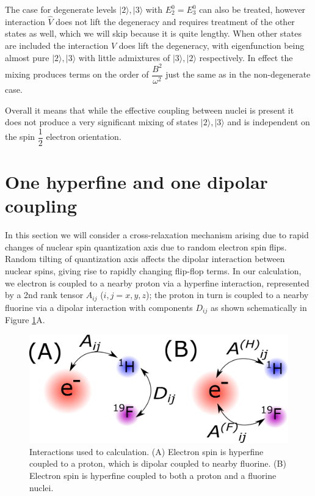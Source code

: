 \documentclass[a4paper, 12pt]{article}
\begin{document}
The case for degenerate levels $\vert 2 \rangle, \vert 3 \rangle$ with $E_2^0 = E_3^0$ can also be treated, however interaction $\hat{V}$ does not lift the degeneracy and requires treatment of the other states as well, which we will skip  because it is quite lengthy. When other states are included the interaction $\hat{V}$ does lift the degeneracy, with eigenfunction being almost pure $\vert 2 \rangle, \vert 3 \rangle$ with little admixtures of $\vert 3 \rangle, \vert 2 \rangle$ respectively. In effect the mixing produces terms on the order of $\dfrac{B^2}{\omega^2}$ just the same as in the non-degenerate case. 

Overall it means that while the effective coupling between nuclei is present it  does not produce a very significant mixing of states $\vert 2 \rangle, \vert 3 \rangle$ and is independent on the spin $\dfrac{1}{2}$ electron orientation.




\section{One hyperfine and one dipolar coupling} \label{sec: case A}
In this section we will consider a cross-relaxation mechanism arising due to rapid changes of nuclear spin quantization axis due to random electron spin flips. Random tilting of quantization axis affects the dipolar interaction between nuclear spins, giving rise to rapidly changing flip-flop terms.
In our calculation, we electron is coupled to a nearby proton via a hyperfine interaction, represented by a 2nd rank tensor $A_{ij}$ ($i,j=x,y,z$); the proton in turn is coupled to a nearby fluorine via a dipolar interaction with components $D_{ij}$ as shown schematically in Figure \ref{fig:coupling}A.

\begin{figure}[b]
	\caption{Interactions used to calculation. (A) Electron spin is hyperfine coupled to a proton, which is dipolar coupled to nearby fluorine. (B) Electron spin is hyperfine coupled to both a proton and a fluorine nuclei.}
	\label{fig:coupling}
	\centering
	\includegraphics[scale=0.7]{text9330-7-6-8.png}
\end{figure}
\end{document}
